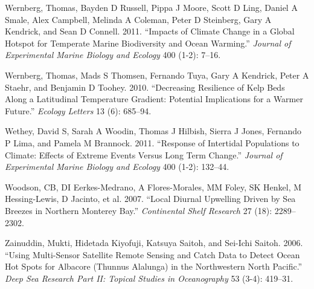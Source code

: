 \documentclass[12pt,a4paper,]{article}
\begin{document}
\leavevmode\hypertarget{ref-Wernberg2011}{}%
Wernberg, Thomas, Bayden D Russell, Pippa J Moore, Scott D Ling, Daniel
A Smale, Alex Campbell, Melinda A Coleman, Peter D Steinberg, Gary A
Kendrick, and Sean D Connell. 2011. ``Impacts of Climate Change in a
Global Hotspot for Temperate Marine Biodiversity and Ocean Warming.''
\emph{Journal of Experimental Marine Biology and Ecology} 400 (1-2):
7--16.

\leavevmode\hypertarget{ref-Wernberg2010}{}%
Wernberg, Thomas, Mads S Thomsen, Fernando Tuya, Gary A Kendrick, Peter
A Staehr, and Benjamin D Toohey. 2010. ``Decreasing Resilience of Kelp
Beds Along a Latitudinal Temperature Gradient: Potential Implications
for a Warmer Future.'' \emph{Ecology Letters} 13 (6): 685--94.

\leavevmode\hypertarget{ref-Wethey2011}{}%
Wethey, David S, Sarah A Woodin, Thomas J Hilbish, Sierra J Jones,
Fernando P Lima, and Pamela M Brannock. 2011. ``Response of Intertidal
Populations to Climate: Effects of Extreme Events Versus Long Term
Change.'' \emph{Journal of Experimental Marine Biology and Ecology} 400
(1-2): 132--44.

\leavevmode\hypertarget{ref-Woodson2007}{}%
Woodson, CB, DI Eerkes-Medrano, A Flores-Morales, MM Foley, SK Henkel, M
Hessing-Lewis, D Jacinto, et al. 2007. ``Local Diurnal Upwelling Driven
by Sea Breezes in Northern Monterey Bay.'' \emph{Continental Shelf
Research} 27 (18): 2289--2302.

\leavevmode\hypertarget{ref-Zainuddin2006}{}%
Zainuddin, Mukti, Hidetada Kiyofuji, Katsuya Saitoh, and Sei-Ichi
Saitoh. 2006. ``Using Multi-Sensor Satellite Remote Sensing and Catch
Data to Detect Ocean Hot Spots for Albacore (Thunnus Alalunga) in the
Northwestern North Pacific.'' \emph{Deep Sea Research Part II: Topical
Studies in Oceanography} 53 (3-4): 419--31.
\end{document}
